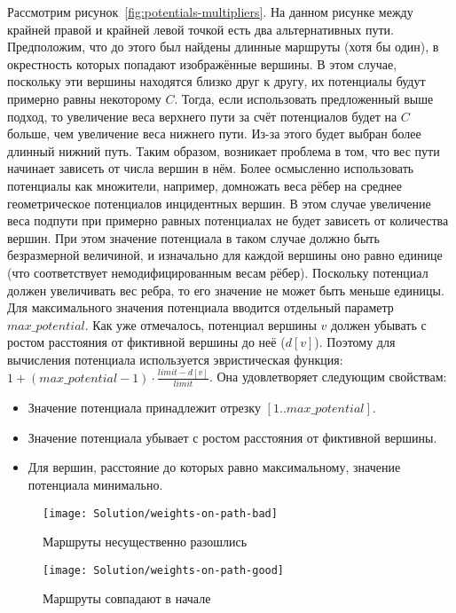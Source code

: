 Рассмотрим рисунок~\ref{fig:potentials-multipliers}. На данном рисунке
между крайней правой и крайней левой точкой есть два альтернативных
пути. Предположим, что до этого был найдены длинные маршруты (хотя бы
один), в окрестность которых попадают изображённые вершины. В этом
случае, поскольку эти вершины находятся близко друг к другу, их
потенциалы будут примерно равны некоторому $C$. Тогда, если
использовать предложенный выше подход, то увеличение веса верхнего
пути за счёт потенциалов будет на $C$ больше, чем увеличение веса
нижнего пути. Из-за этого будет выбран более длинный нижний путь.
Таким образом, возникает проблема в том, что вес пути начинает
зависеть от числа вершин в нём. Более осмысленно использовать
потенциалы как множители, например, домножать веса рёбер на среднее
геометрическое потенциалов инцидентных вершин. В этом случае
увеличение веса подпути при примерно равных потенциалах не будет
зависеть от количества вершин. При этом значение потенциала в таком
случае должно быть безразмерной величиной, и изначально для каждой
вершины оно равно единице (что соответствует немодифицированным весам
рёбер). Поскольку потенциал должен увеличивать вес ребра, то его
значение не может быть меньше единицы. Для максимального значения
потенциала вводится отдельный параметр $max\_potential$. Как уже
отмечалось, потенциал вершины $v$ должен убывать с ростом расстояния
от фиктивной вершины до неё ($d[v]$). Поэтому для вычисления
потенциала используется эвристическая функция:
$1 + (max\_potential - 1) \cdot \frac{limit - d[v]}{limit}$. Она
удовлетворяет следующим свойствам:
\begin{itemize}
    \item Значение потенциала принадлежит отрезку $[1 .. max\_potential]$.
    \item Значение потенциала убывает с ростом расстояния от фиктивной
      вершины.
    \item Для вершин, расстояние до которых равно максимальному, значение
      потенциала минимально.
\end{itemize}

\begin{figure}
    \texttt{[image: Solution/weights-on-path-bad]}
    \caption{Маршруты несущественно разошлись}
    \label{fig:weights-on-path-bad}
\end{figure}

\begin{figure}
    \texttt{[image: Solution/weights-on-path-good]}
    \caption{Маршруты совпадают в начале}
    \label{fig:weights-on-path-good}
\end{figure}

